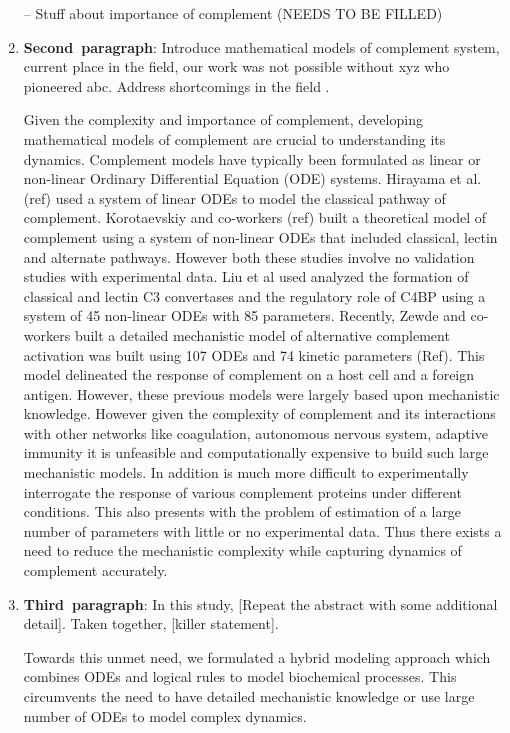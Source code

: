 \documentclass[12pt]{article}
\begin{document}
\begin{enumerate}
	-- Stuff about importance of complement (NEEDS TO BE FILLED)
	
	\item{\textbf{Second~paragraph}: Introduce mathematical models of complement system, current place in the field, our work was not possible without xyz who pioneered abc. Address shortcomings in the field .}
	
	Given the complexity and importance of complement, developing mathematical models of complement are crucial to understanding its dynamics. Complement models have typically been formulated as linear or non-linear Ordinary Differential Equation (ODE) systems. Hirayama  et al. (ref) used a system of linear ODEs to model the classical pathway of complement. Korotaevskiy and co-workers (ref) built a theoretical model of complement using a system of non-linear ODEs that included classical, lectin and alternate pathways. However both these studies involve no validation studies with experimental data. Liu et al used analyzed the formation of classical and lectin C3 convertases and the regulatory role of C4BP using a system of 45 non-linear ODEs with 85 parameters.  Recently, Zewde and co-workers built a detailed mechanistic model of alternative complement activation was built using 107 ODEs and 74 kinetic parameters (Ref). This model delineated the response of complement on a host cell and a foreign antigen. However, these previous models were largely based upon mechanistic knowledge.  However given the complexity of complement and its interactions with other networks like coagulation, autonomous nervous system, adaptive immunity it is unfeasible and computationally expensive to build such large mechanistic models. In addition is much more difficult to experimentally interrogate the response of various complement proteins under different conditions. This also presents with the problem of estimation of a large number of parameters with little or no experimental data. Thus there exists a need to reduce the mechanistic complexity while capturing dynamics of complement accurately.
	
    \item{\textbf{Third~paragraph}: In this study, [Repeat the abstract with some additional detail]. Taken together, [killer statement].}
   
    Towards this unmet need, we formulated a hybrid modeling approach which combines ODEs and logical rules to model biochemical processes. This circumvents the need to have detailed mechanistic knowledge or use large number of ODEs to model complex dynamics. 

	
	
\end{enumerate}
\end{document}
